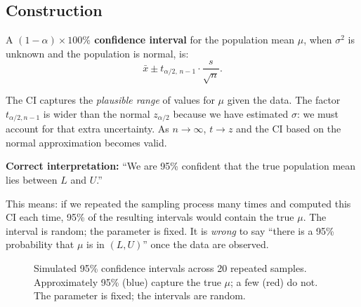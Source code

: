 \documentclass[12pt, a4paper, oneside]{book}
\theoremstyle{definition}
\theoremstyle{plain}
\theoremstyle{remark}
\begin{document}
\subsection{Construction}

A \textbf{$(1-\alpha)\times 100\%$ confidence interval} for the population
mean $\mu$, when $\sigma^2$ is unknown and the population is normal, is:
\[
  \bar{x} \pm t_{\alpha/2,\,n-1} \cdot \frac{s}{\sqrt{n}}.
\]

\begin{intuition}
The CI captures the \emph{plausible range} of values for $\mu$ given the
data.  The factor $t_{\alpha/2,n-1}$ is wider than the normal $z_{\alpha/2}$
because we have estimated $\sigma$: we must account for that extra uncertainty.
As $n\to\infty$, $t\to z$ and the CI based on the normal approximation
becomes valid.
\end{intuition}

\begin{keyresult}
\textbf{Correct interpretation:}
``We are 95\% confident that the true population mean lies between $L$ and $U$.''

This means: if we repeated the sampling process many times and computed this
CI each time, 95\% of the resulting intervals would contain the true $\mu$.
The interval is random; the parameter is fixed.  It is \emph{wrong} to say
``there is a 95\% probability that $\mu$ is in $(L,U)$'' once the data are observed.
\end{keyresult}

\begin{figure}[h]
\centering
{}
\caption{Simulated 95\% confidence intervals across 20 repeated samples.
  Approximately 95\% (blue) capture the true $\mu$; a few (red) do not.
  The parameter is fixed; the intervals are random.}
\label{fig:ci-sim}
\end{figure}
\end{document}
